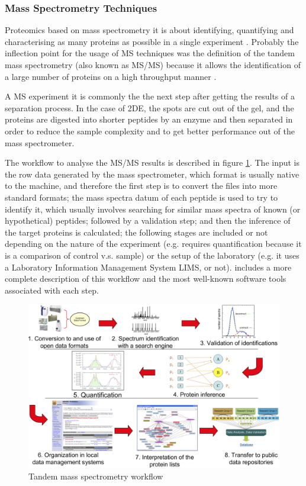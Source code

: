 \subsubsection{Mass Spectrometry Techniques}
Proteomics based on mass spectrometry it is about identifying, quantifying and characterising  as many proteins as possible in a single experiment . Probably the inflection point for the usage of MS techniques was the definition of the tandem mass spectrometry (also known as MS/MS) because it allows the identification of a large number of proteins on a high throughput manner .

A MS experiment it is commonly the the next step after getting the results of a separation process. In the case of 2DE, the spots are cut out of the gel, and the proteins are digested into shorter peptides by an enzyme and then separated in order to reduce the sample complexity and to get better performance out of the mass spectrometer.

The workflow to analyse the MS/MS results is described in figure \ref{fig:ms_workflow}. The input is the row data generated by the mass spectrometer, which format is usually native to the machine, and therefore the first step is to convert the files into more standard formats; the mass spectra datum of each peptide is used to try to identify it, which usually involves searching for similar mass spectra of known (or hypothetical) peptides; followed by a validation step; and then the inference of the target proteins is calculated; the following stages are included or not depending on the nature of the experiment (e.g. requires quantification because it is a comparison of control v.s. sample) or the setup of the laboratory (e.g. it uses a Laboratory Information Management System LIMS, or not). \cite{DEU2008} includes a more complete description of this workflow and the most well-known software tools associated with each step.

\begin{figure}  
\centering
\includegraphics[width=6in]{figures/ms_workflow.png}
\caption[Tandem mass spectrometry workflow.]{Tandem mass spectrometry workflow
\label{fig:ms_workflow}}
\end{figure}


